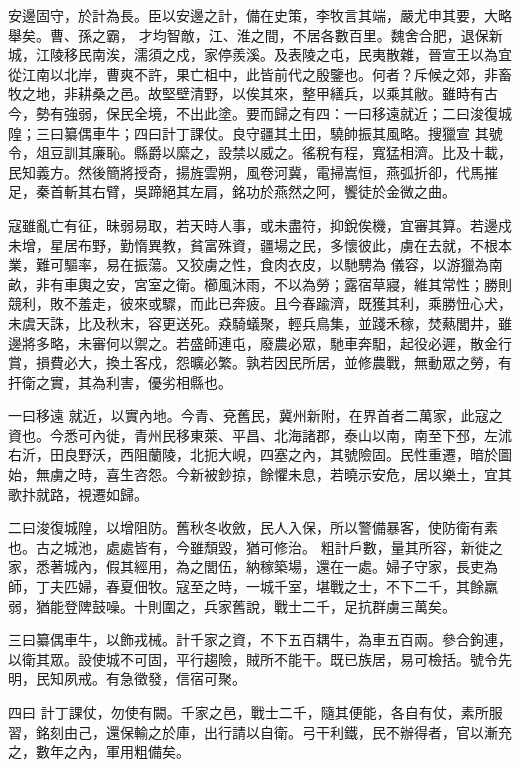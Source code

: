 \begin{pinyinscope}
 安邊固守，於計為長。臣以安邊之計，備在史策，李牧言其端，嚴尤申其要，大略舉矣。曹、孫之霸，
 才均智敵，江、淮之間，不居各數百里。魏舍合肥，退保新城，江陵移民南涘，濡須之戍，家停羨溪。及表陵之屯，民夷散雜，晉宣王以為宜從江南以北岸，曹爽不許，果亡柤中，此皆前代之殷鑒也。何者？斥候之郊，非畜牧之地，非耕桑之邑。故堅壁清野，以俟其來，整甲繕兵，以乘其敝。雖時有古今，勢有強弱，保民全境，不出此塗。要而歸之有四：一曰移遠就近；二曰浚復城隍；三曰纂偶車牛；四曰計丁課仗。良守疆其土田，驍帥振其風略。搜獵宣
 其號令，俎豆訓其廉恥。縣爵以縻之，設禁以威之。徭稅有程，寬猛相濟。比及十載，民知義方。然後簡將授奇，揚旌雲朔，風卷河冀，電掃嵩恒，燕弧折卻，代馬摧足，秦首斬其右臂，吳蹄絕其左肩，銘功於燕然之阿，饗徒於金微之曲。



 寇雖亂亡有征，昧弱易取，若天時人事，或未盡符，抑銳俟機，宜審其算。若邊戍未增，星居布野，勤惰異教，貧富殊資，疆場之民，多懷彼此，虜在去就，不根本業，難可驅率，易在振蕩。又狡虜之性，食肉衣皮，以馳騁為
 儀容，以游獵為南畝，非有車輿之安，宮室之衛。櫛風沐雨，不以為勞；露宿草寢，維其常性；勝則競利，敗不羞走，彼來或驟，而此已奔疲。且今春踰濟，既獲其利，乘勝忸心犬，未虞天誅，比及秋末，容更送死。猋騎蟻聚，輕兵鳥集，並踐禾稼，焚爇閭井，雖邊將多略，未審何以禦之。若盛師連屯，廢農必眾，馳車奔馹，起役必遲，散金行賞，損費必大，換土客戍，怨曠必繁。孰若因民所居，並修農戰，無動眾之勞，有扞衛之實，其為利害，優劣相縣也。



 一曰移遠
 就近，以實內地。今青、兗舊民，冀州新附，在界首者二萬家，此寇之資也。今悉可內徙，青州民移東萊、平昌、北海諸郡，泰山以南，南至下邳，左沭右沂，田良野沃，西阻蘭陵，北扼大峴，四塞之內，其號險固。民性重遷，暗於圖始，無虜之時，喜生咨怨。今新被鈔掠，餘懼未息，若曉示安危，居以樂土，宜其歌抃就路，視遷如歸。



 二曰浚復城隍，以增阻防。舊秋冬收斂，民人入保，所以警備暴客，使防衛有素也。古之城池，處處皆有，今雖頹毀，猶可修治。
 粗計戶數，量其所容，新徙之家，悉著城內，假其經用，為之閭伍，納稼築場，還在一處。婦子守家，長吏為師，丁夫匹婦，春夏佃牧。寇至之時，一城千室，堪戰之士，不下二千，其餘羸弱，猶能登陴鼓噪。十則圍之，兵家舊說，戰士二千，足抗群虜三萬矣。



 三曰纂偶車牛，以飾戎械。計千家之資，不下五百耦牛，為車五百兩。參合鉤連，以衛其眾。設使城不可固，平行趨險，賊所不能干。既已族居，易可檢括。號令先明，民知夙戒。有急徵發，信宿可聚。



 四曰
 計丁課仗，勿使有闕。千家之邑，戰士二千，隨其便能，各自有仗，素所服習，銘刻由己，還保輸之於庫，出行請以自衛。弓干利鐵，民不辦得者，官以漸充之，數年之內，軍用粗備矣。




\end{pinyinscope}
